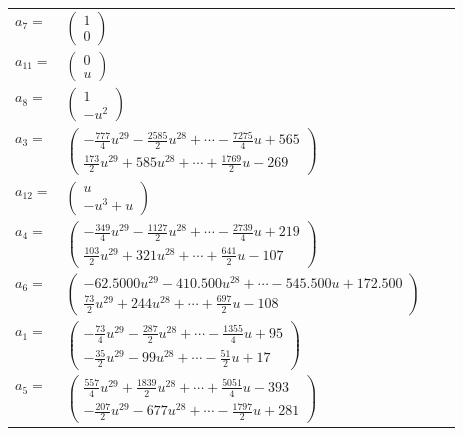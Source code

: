 \documentclass[1p]{elsarticle_modified}
\theoremstyle{definition}
\begin{document}
\begin{tabular}{m{7pt} m{180pt} m{7pt} m{180pt} }
\flushright $a_{7}=$&$\begin{pmatrix}1\\0\end{pmatrix}$ \\
\flushright $a_{11}=$&$\begin{pmatrix}0\\u\end{pmatrix}$ \\
\flushright $a_{8}=$&$\begin{pmatrix}1\\- u^2\end{pmatrix}$ \\
\flushright $a_{3}=$&$\begin{pmatrix}-\frac{777}{4} u^{29}-\frac{2585}{2} u^{28}+\cdots-\frac{7275}{4} u+565\\\frac{173}{2} u^{29}+585 u^{28}+\cdots+\frac{1769}{2} u-269\end{pmatrix}$ \\
\flushright $a_{12}=$&$\begin{pmatrix}u\\- u^3+u\end{pmatrix}$ \\
\flushright $a_{4}=$&$\begin{pmatrix}-\frac{349}{4} u^{29}-\frac{1127}{2} u^{28}+\cdots-\frac{2739}{4} u+219\\\frac{103}{2} u^{29}+321 u^{28}+\cdots+\frac{641}{2} u-107\end{pmatrix}$ \\
\flushright $a_{6}=$&$\begin{pmatrix}-62.5000 u^{29}-410.500 u^{28}+\cdots-545.500 u+172.500\\\frac{73}{2} u^{29}+244 u^{28}+\cdots+\frac{697}{2} u-108\end{pmatrix}$ \\
\flushright $a_{1}=$&$\begin{pmatrix}-\frac{73}{4} u^{29}-\frac{287}{2} u^{28}+\cdots-\frac{1355}{4} u+95\\-\frac{35}{2} u^{29}-99 u^{28}+\cdots-\frac{51}{2} u+17\end{pmatrix}$ \\
\flushright $a_{5}=$&$\begin{pmatrix}\frac{557}{4} u^{29}+\frac{1839}{2} u^{28}+\cdots+\frac{5051}{4} u-393\\-\frac{207}{2} u^{29}-677 u^{28}+\cdots-\frac{1797}{2} u+281\end{pmatrix}$ \\

\end{tabular}
\end{document}
